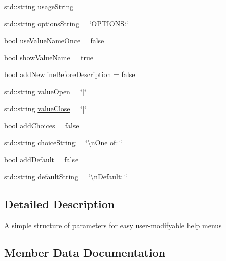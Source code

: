 \begin{DoxyCompactItemize}
\item 
std\+::string \hyperlink{structargs_1_1_help_params_a1f8f986fccf51e79ce33baab2a62f7fc}{usage\+String}
\item 
std\+::string \hyperlink{structargs_1_1_help_params_a73a6302232629d1de99b468be7b5a21a}{options\+String} = \char`\"{}O\+P\+T\+I\+O\+N\+S\+:\char`\"{}
\item 
bool \hyperlink{structargs_1_1_help_params_abf56924de2a8c3447e7ba04a642f1c7f}{use\+Value\+Name\+Once} = false
\item 
bool \hyperlink{structargs_1_1_help_params_a2c758b53a35f03ec5f7b0682b82c1ad4}{show\+Value\+Name} = true
\item 
bool \hyperlink{structargs_1_1_help_params_a74a2811f045cd7cb1d2a09a4fd54f7d6}{add\+Newline\+Before\+Description} = false
\item 
std\+::string \hyperlink{structargs_1_1_help_params_a40ec851422baecc5439bac2758db1030}{value\+Open} = \char`\"{}\mbox{[}\char`\"{}
\item 
std\+::string \hyperlink{structargs_1_1_help_params_a646a89fdbdcf769e1fc4b44421a7dc79}{value\+Close} = \char`\"{}\mbox{]}\char`\"{}
\item 
bool \hyperlink{structargs_1_1_help_params_ae824aa04e604190bb88aa6316fd4e18b}{add\+Choices} = false
\item 
std\+::string \hyperlink{structargs_1_1_help_params_afa09e83834bc001df11b686b528776e9}{choice\+String} = \char`\"{}\textbackslash{}n\+One of\+: \char`\"{}
\item 
bool \hyperlink{structargs_1_1_help_params_a953c55070619de46ce305dc1dcff3854}{add\+Default} = false
\item 
std\+::string \hyperlink{structargs_1_1_help_params_acbda51396a545149cebf67170d14882e}{default\+String} = \char`\"{}\textbackslash{}n\+Default\+: \char`\"{}
\end{DoxyCompactItemize}


\subsection{Detailed Description}
A simple structure of parameters for easy user-\/modifyable help menus 

\subsection{Member Data Documentation}
\mbox{\label{structargs_1_1_help_params_ae824aa04e604190bb88aa6316fd4e18b}} 

